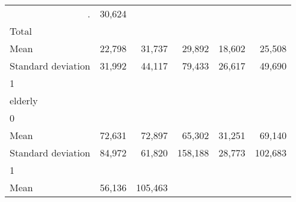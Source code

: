 \begin{tabular}{llllll}
  \multicolumn{1}{r}{.} &
  \multicolumn{1}{r}{30,624} \\
\multicolumn{1}{l}{\hspace{3em}Total} &
  \multicolumn{1}{|r}{} &
  \multicolumn{1}{r}{} &
  \multicolumn{1}{r}{} &
  \multicolumn{1}{r}{} &
  \multicolumn{1}{r}{} \\
\multicolumn{1}{l}{\hspace{4em}Mean} &
  \multicolumn{1}{|r}{22,798} &
  \multicolumn{1}{r}{31,737} &
  \multicolumn{1}{r}{29,892} &
  \multicolumn{1}{r}{18,602} &
  \multicolumn{1}{r}{25,508} \\
\multicolumn{1}{l}{\hspace{4em}Standard deviation} &
  \multicolumn{1}{|r}{31,992} &
  \multicolumn{1}{r}{44,117} &
  \multicolumn{1}{r}{79,433} &
  \multicolumn{1}{r}{26,617} &
  \multicolumn{1}{r}{49,690} \\
\multicolumn{1}{l}{\hspace{1em}1} &
  \multicolumn{1}{|r}{} &
  \multicolumn{1}{r}{} &
  \multicolumn{1}{r}{} &
  \multicolumn{1}{r}{} &
  \multicolumn{1}{r}{} \\
\multicolumn{1}{l}{\hspace{2em}elderly} &
  \multicolumn{1}{|r}{} &
  \multicolumn{1}{r}{} &
  \multicolumn{1}{r}{} &
  \multicolumn{1}{r}{} &
  \multicolumn{1}{r}{} \\
\multicolumn{1}{l}{\hspace{3em}0} &
  \multicolumn{1}{|r}{} &
  \multicolumn{1}{r}{} &
  \multicolumn{1}{r}{} &
  \multicolumn{1}{r}{} &
  \multicolumn{1}{r}{} \\
\multicolumn{1}{l}{\hspace{4em}Mean} &
  \multicolumn{1}{|r}{72,631} &
  \multicolumn{1}{r}{72,897} &
  \multicolumn{1}{r}{65,302} &
  \multicolumn{1}{r}{31,251} &
  \multicolumn{1}{r}{69,140} \\
\multicolumn{1}{l}{\hspace{4em}Standard deviation} &
  \multicolumn{1}{|r}{84,972} &
  \multicolumn{1}{r}{61,820} &
  \multicolumn{1}{r}{158,188} &
  \multicolumn{1}{r}{28,773} &
  \multicolumn{1}{r}{102,683} \\
\multicolumn{1}{l}{\hspace{3em}1} &
  \multicolumn{1}{|r}{} &
  \multicolumn{1}{r}{} &
  \multicolumn{1}{r}{} &
  \multicolumn{1}{r}{} &
  \multicolumn{1}{r}{} \\
\multicolumn{1}{l}{\hspace{4em}Mean} &
  \multicolumn{1}{|r}{56,136} &
  \multicolumn{1}{r}{105,463} &

\end{tabular}
